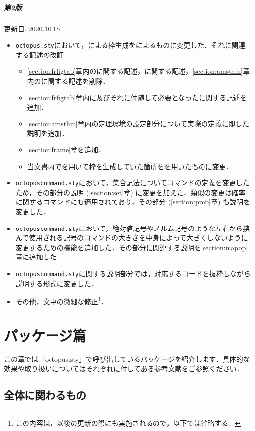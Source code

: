 \documentclass[uplatex]{jsreport}
\begin{document}
\paragraph{第2版} 更新日: 2020.10.18\par
\begin{itemize}
\item \texttt{octopus.sty}において，による枠生成をによるものに変更した．それに関連する記述の改訂．
\begin{itemize}
  \item \ref{section:frfigtab}章内のに関する記述，に関する記述，\ref{section:amsthm}章内のに関する記述を削除．
  \item \ref{section:frfigtab}章内に及びそれに付随して必要となったに関する記述を追加．
  \item \ref{section:amsthm}章内の定理環境の設定部分について実際の定義に即した説明を追加．
  \item \ref{section:frame}章を追加．
  \item 当文書内でを用いて枠を生成していた箇所をを用いたものに変更．
\end{itemize}
\item \texttt{octopuscommand.sty}において，集合記法についてコマンドの定義を変更したため，その部分の説明 (\ref{section:set}章) に変更を加えた．類似の変更は確率に関するコマンドにも適用されており，その部分 (\ref{section:prob}章) も説明を変更した．
\item \texttt{octopuscommand.sty}において，絶対値記号やノルム記号のような左右から挟んで使用される記号のコマンドの大きさを中身によって大きくしないように変更するための機能を追加した．その部分に関連する説明を\ref{section:mapop}章に追加した．
\item \texttt{octopuscommand.sty}に関する説明部分では，対応するコードを抜粋しながら説明する形式に変更した．
\item その他，文中の微細な修正\footnote{この内容は，以後の更新の際にも実施されるので，以下では省略する．}．
\end{itemize}
\newpage
\chapter{パッケージ篇}
この章では「octopus.sty」で呼び出しているパッケージを紹介します．具体的な効果や取り扱いについてはそれぞれに付してある参考文献をご参照ください．
\section{全体に関わるもの}
\end{document}
